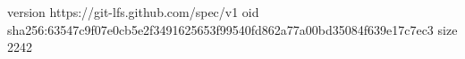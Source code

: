 version https://git-lfs.github.com/spec/v1
oid sha256:63547c9f07e0cb5e2f3491625653f99540fd862a77a00bd35084f639e17c7ec3
size 2242
